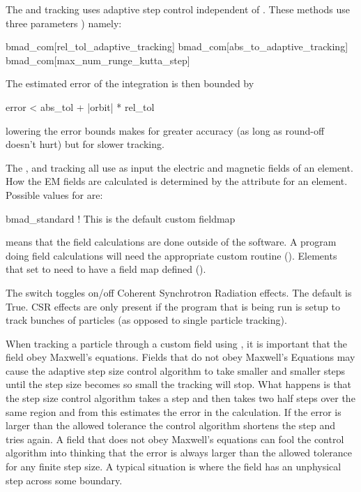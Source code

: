 The  and  tracking uses adaptive step
control independent of . These methods use three  parameters
) namely:
\begin{example}
  bmad_com[rel_tol_adaptive_tracking]
  bmad_com[abs_to_adaptive_tracking]
  bmad_com[max_num_runge_kutta_step]
\end{example}
The estimated error of the integration is then bounded by
\begin{example}
  error < abs_tol + |orbit| * rel_tol
\end{example}
lowering the error bounds makes for greater accuracy (as long as round-off 
doesn't hurt) but for slower tracking. 

The , and  tracking all use
as input the electric and magnetic fields of an element. How the EM fields
are calculated is determined by the  attribute for an element.
Possible values for  are:
\begin{example}
  bmad_standard     ! This is the default
  custom
  fieldmap
\end{example}
 means that the field calculations are done outside of the \bmad software. A
program doing  field calculations will need the appropriate custom routine
(). Elements that set  to  need to have a
field map defined ().

The  switch toggles on/off Coherent Synchrotron Radiation effects.
The default is True. CSR effects are only present if the program that is being run
is setup to track bunches of particles (as opposed to single particle tracking).

 When tracking a particle through a custom field using
, it is important that the field obey Maxwell's
equations. Fields that do not obey Maxwell's Equations may cause the
 adaptive step size control algorithm to take smaller
and smaller steps until the step size becomes so small the tracking
will stop. What happens is that the step size control algorithm takes
a step and then takes two half steps over the same region and from
this estimates the error in the calculation. If the error is larger
than the allowed tolerance the control algorithm shortens the step and
tries again. A field that does not obey Maxwell's equations can fool
the control algorithm into thinking that the error is always larger
than the allowed tolerance for any finite step size. A typical
situation is where the field has an unphysical step across some
boundary.

